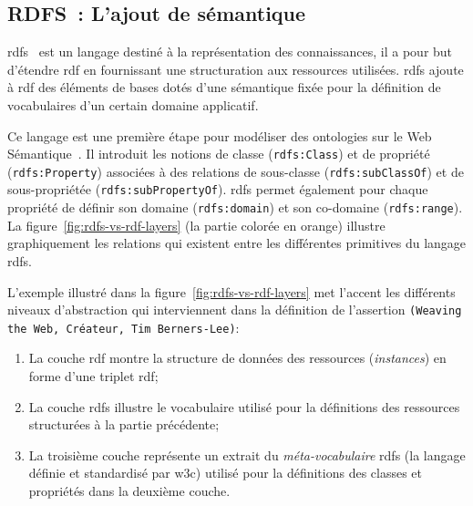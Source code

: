 \subsection{RDFS~: L'ajout de sémantique}
\label{sec:semantic-web-rdfs}

\acrshort{rdfs}~\cite{brickley2000resource} est un langage destiné à
la représentation des connaissances, il a pour but d'étendre
\acrshort{rdf} en fournissant une structuration aux ressources
utilisées. \acrshort{rdfs} ajoute à \acrshort{rdf} des éléments de
bases dotés d'une sémantique fixée pour la définition de vocabulaires
d'un certain domaine applicatif.\medskip

Ce langage est une première étape pour modéliser des ontologies sur le
Web Sémantique~\cite{passant2009technologies}. Il introduit les
notions de classe (\texttt{rdfs:Class}) et de propriété
(\texttt{rdfs:Property}) associées à des relations de sous-classe
(\texttt{rdfs:subClassOf}) et de sous-propriétée
(\texttt{rdfs:subPropertyOf}). \acrshort{rdfs} permet également pour
chaque propriété de définir son domaine (\texttt{rdfs:domain}) et son
co-domaine (\texttt{rdfs:range}). La
figure~\ref{fig:rdfs-vs-rdf-layers} (la partie colorée en orange)
illustre graphiquement les relations qui existent entre les
différentes primitives du langage \acrshort{rdfs}.



L'exemple illustré dans la figure~\ref{fig:rdfs-vs-rdf-layers} met
l'accent les différents niveaux d'abstraction qui interviennent dans
la définition de l'assertion \texttt{(Weaving the Web, Créateur, Tim
  Berners-Lee)}:\medskip

\begin{enumerate}
\item La couche \acrshort{rdf} montre la structure de données des
  ressources (\emph{instances}) en forme d'une triplet \acrshort{rdf};

\item La couche \acrshort{rdfs} illustre le vocabulaire utilisé pour
  la définitions des ressources structurées à la partie précédente;

\item La troisième couche représente un extrait du
  \emph{méta-vocabulaire} \acrshort{rdfs} (la langage définie et
  standardisé par \acrshort{w3c}) utilisé pour la définitions des
  classes et propriétés dans la deuxième couche.\medskip
\end{enumerate}


